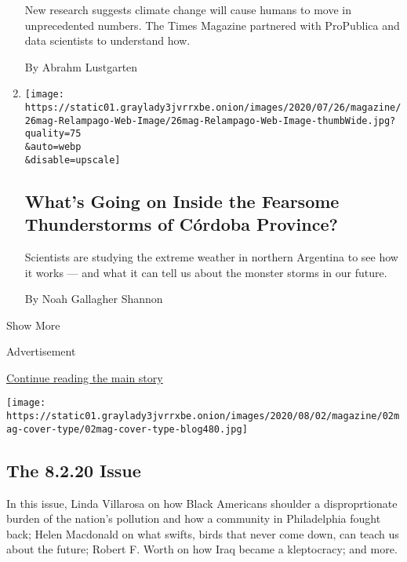 \begin{enumerate}
  New research suggests climate change will cause humans to move in
  unprecedented numbers. The Times Magazine partnered with ProPublica
  and data scientists to understand how.

  By Abrahm Lustgarten
\item
  \href{/interactive/2020/07/22/magazine/worst-storms-argentina.html}{}

  \texttt{[image: https://static01.graylady3jvrrxbe.onion/images/2020/07/26/magazine/26mag-Relampago-Web-Image/26mag-Relampago-Web-Image-thumbWide.jpg?quality=75\\\&auto=webp\\\&disable=upscale]}

  \hypertarget{whats-going-on-inside-the-fearsome-thunderstorms-of-cuxf3rdoba-province}{%
  \subsection{What's Going on Inside the Fearsome Thunderstorms of
  Córdoba
  Province?}\label{whats-going-on-inside-the-fearsome-thunderstorms-of-cuxf3rdoba-province}}

  Scientists are studying the extreme weather in northern Argentina to
  see how it works --- and what it can tell us about the monster storms
  in our future.

  By Noah Gallagher Shannon
\end{enumerate}

Show More

Advertisement

\protect\hyperlink{after-mid2}{Continue reading the main story}

\href{https://www.nytimes3xbfgragh.onion/issue/magazine/2020/07/31/the-8220-issue}{}

\texttt{[image: https://static01.graylady3jvrrxbe.onion/images/2020/08/02/magazine/02mag-cover-type/02mag-cover-type-blog480.jpg]}

\href{https://www.nytimes3xbfgragh.onion/issue/magazine/2020/07/31/the-8220-issue}{}

\hypertarget{the-8220-issue}{%
\subsection{The 8.2.20 Issue}\label{the-8220-issue}}

In this issue, Linda Villarosa on how Black Americans shoulder a
disproprtionate burden of the nation's pollution and how a community in
Philadelphia fought back; Helen Macdonald on what swifts, birds that
never come down, can teach us about the future; Robert F. Worth on how
Iraq became a kleptocracy; and more.

